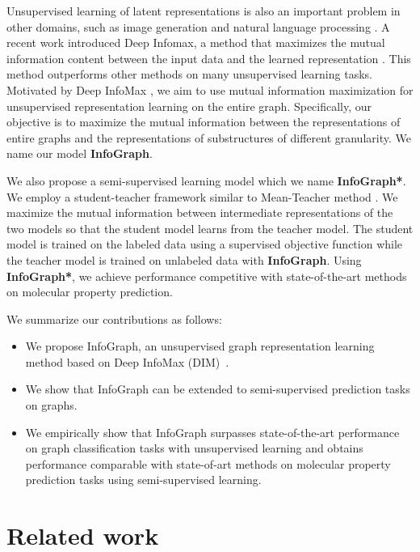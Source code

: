 \documentclass{article} \usepackage{iclr2020_conference,times}
\def\method{InfoGraph}
\begin{document}
Unsupervised learning of latent representations is also an important problem in other domains, such as image generation \cite{kingma2013auto,kim2018disentangling} and natural language processing \cite{mikolov2013efficient}. 
A recent work introduced Deep Infomax, a method that maximizes the mutual information content between the input data and the learned representation \cite{hjelm2018learning}. This method outperforms other methods on many unsupervised learning tasks.
Motivated by Deep InfoMax \cite{hjelm2018learning}, we aim to use mutual information maximization for unsupervised representation learning 
on the entire graph. Specifically, our objective is to maximize the mutual information between the representations of entire graphs and the representations of substructures of different granularity. We name our model \textbf{\method{}}.







We also propose a semi-supervised learning model which we name \textbf{\method{}*}. We employ a student-teacher framework similar to Mean-Teacher method \cite{tarvainen2017mean}. We maximize the mutual information between intermediate representations of the two models so that the student model learns from the teacher model. The student model is trained on the labeled data using a supervised objective function while the teacher model is trained on unlabeled data with \textbf{\method{}}. Using \textbf{\method{}*}, we achieve performance competitive with state-of-the-art methods on molecular property prediction.






We summarize our contributions as follows:
\begin{itemize}

 \item We propose \method{}, an unsupervised graph representation learning method based on Deep InfoMax (DIM)~\cite{hjelm2018learning}.
 
  \item We show that \method{} can be extended to semi-supervised prediction tasks on graphs.
  


\item We empirically show that \method{} surpasses state-of-the-art performance on graph classification tasks with unsupervised learning and obtains performance comparable with state-of-art methods on molecular property prediction tasks using semi-supervised learning.




\end{itemize} \section{Related work}
\end{document}
